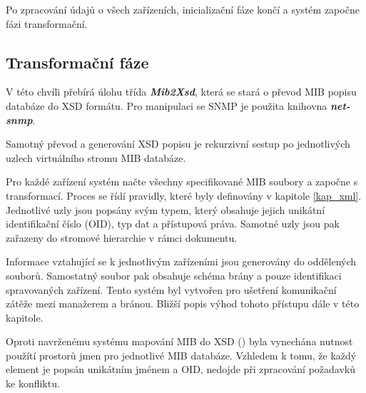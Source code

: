 Po zpracování údajů o všech zařízeních, inicializační fáze končí a systém započne fázi transformační.

\subsection{Transformační fáze}
V této chvíli přebírá úlohu třída \textit{\textbf{Mib2Xsd}}, která se stará o převod MIB popisu databáze do XSD formátu. Pro manipulaci se SNMP je
použita knihovna \textit{\textbf{net-snmp}}. %

Samotný převod a generování XSD popisu je rekurzivní sestup po jednotlivých uzlech virtuálního stromu MIB databáze.

Pro každé zařízení systém načte všechny specifikované MIB soubory a započne s transformací. Proces se řídí pravidly, které byly definovány v kapitole \ref{kap_xml}.
Jednotlivé uzly jsou popsány svým typem, který obsahuje jejich unikátní identifikační číslo (OID), typ dat a přístupová práva. Samotné uzly jsou pak zařazeny
do stromové hierarchie v rámci dokumentu.

Informace vztahující se k jednotlivým zařízeními jsou generovány do oddělených souborů. Samostatný soubor
pak obsahuje schéma brány a pouze identifikaci spravovaných zařízení. Tento systém byl vytvořen pro ušetření komunikační zátěže mezi manažerem a bránou.
Bližší popis výhod tohoto přístupu dále v této kapitole.

Oproti navrženému systému mapování MIB do XSD (\cite{macejko_dipl}) byla vynechána nutnost použítí prostorů jmen pro jednotlivé MIB databáze. Vzhledem
k tomu, že každý element je popsán unikátním jménem a OID, nedojde při zpracování požadavků ke konfliktu.

